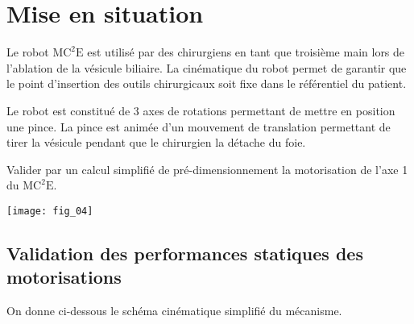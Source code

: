 
\def\xxactivite{TD}
\def\xxauteur{\textsl{Xavier Pessoles}}
\def\xxtitreexo{Micromanipulateur compact pour la chirurgie endoscopique ($\text{MC}^2\text{E}$)}
\def\xxsourceexo{\hspace{.2cm} \footnotesize{Concours Commun Mines Ponts 2016}}

\def\xxcompetences{%
\textsl{%
\textbf{Savoirs et compétences :}\\} \vspace{-.5cm}
\begin{itemize}
\item \textit{Res2.C18} : principe fondamental de la statique;
\item \textit{Res2.C19} : équilibre d’un solide, d’un ensemble de solides;
\item \textit{Res2.C20} : théorème des actions réciproques.
\end{itemize}
}

\def\xxauteur{\textsl{Xavier Pessoles}}


\def\xxfigures{
\texttt{[image: fig\_01]}
}%




\section*{Mise en situation}
\ifprof
\else
Le robot $\text{MC}^2\text{E}$ est utilisé par des chirurgiens en tant que troisième main lors de l'ablation de la vésicule biliaire. La cinématique du robot permet de garantir que le point d'insertion des outils chirurgicaux soit fixe dans le référentiel du patient. 

Le robot est constitué de 3 axes de rotations permettant de mettre en position une pince. La pince est animée d'un mouvement de translation permettant de tirer la vésicule pendant que le chirurgien la détache du foie. 


\begin{obj}
Valider par un calcul simplifié de pré-dimensionnement la motorisation de l'axe 1 du  $\text{MC}^2\text{E}$.

\end{obj}


\begin{center}
\texttt{[image: fig\_04]}
\end{center}

\subsection*{Validation des performances statiques des motorisations}
On donne ci-dessous le schéma cinématique simplifié du mécanisme.

